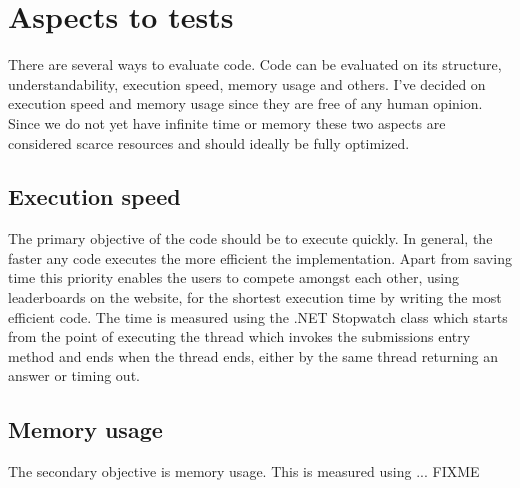 \section{Aspects to tests}
There are several ways to evaluate code. Code can be evaluated on its structure, understandability, execution speed, memory usage and others. I've decided on execution speed and memory usage since they are free of any human opinion. Since we do not yet have infinite time or memory these two aspects are considered scarce resources and should ideally be fully optimized.


\subsection{Execution speed}
The primary objective of the code should be to execute quickly. In general, the faster any code executes the more efficient the implementation. Apart from saving time this priority enables the users to compete amongst each other, using leaderboards on the website, for the shortest execution time by writing the most efficient code. 
The time is measured using the .NET Stopwatch class \cite{Stopwatch} which starts from the point of executing the thread which invokes the submissions entry method and ends when the thread ends, either by the same thread returning an answer or timing out. 


\subsection{Memory usage}
The secondary objective is memory usage. This is measured using ... FIXME